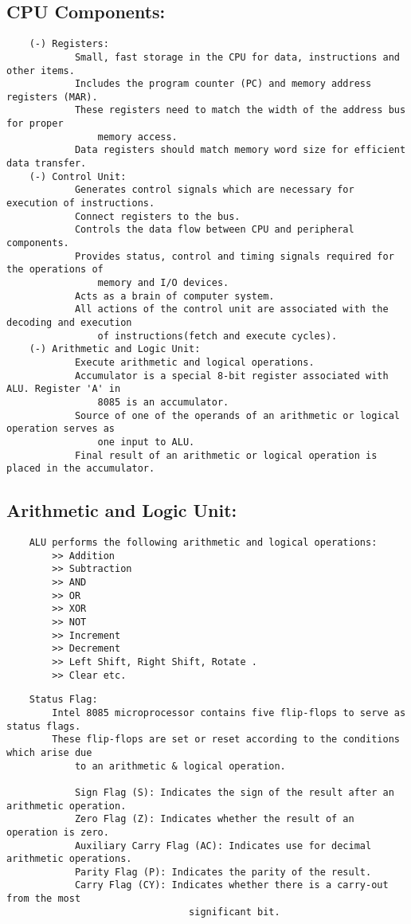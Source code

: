 \documentclass{article}
\begin{document}
\subsection*{CPU Components:}
\begin{verbatim}
    (-) Registers:
            Small, fast storage in the CPU for data, instructions and other items.
            Includes the program counter (PC) and memory address registers (MAR).
            These registers need to match the width of the address bus for proper 
                memory access.
            Data registers should match memory word size for efficient data transfer.
    (-) Control Unit:
            Generates control signals which are necessary for execution of instructions.
            Connect registers to the bus.
            Controls the data flow between CPU and peripheral components.
            Provides status, control and timing signals required for the operations of
                memory and I/O devices.
            Acts as a brain of computer system.
            All actions of the control unit are associated with the decoding and execution
                of instructions(fetch and execute cycles).
    (-) Arithmetic and Logic Unit:
            Execute arithmetic and logical operations.
            Accumulator is a special 8-bit register associated with ALU. Register 'A' in
                8085 is an accumulator.
            Source of one of the operands of an arithmetic or logical operation serves as
                one input to ALU.
            Final result of an arithmetic or logical operation is placed in the accumulator.
\end{verbatim}

\subsection*{Arithmetic and Logic Unit:}
\begin{verbatim}
    ALU performs the following arithmetic and logical operations:
        >> Addition
        >> Subtraction
        >> AND
        >> OR
        >> XOR
        >> NOT
        >> Increment
        >> Decrement
        >> Left Shift, Right Shift, Rotate .
        >> Clear etc.
\end{verbatim}
\newpage

\begin{verbatim}
    Status Flag:
        Intel 8085 microprocessor contains five flip-flops to serve as status flags.
        These flip-flops are set or reset according to the conditions which arise due
            to an arithmetic & logical operation.

            Sign Flag (S): Indicates the sign of the result after an arithmetic operation.
            Zero Flag (Z): Indicates whether the result of an operation is zero.
            Auxiliary Carry Flag (AC): Indicates use for decimal arithmetic operations.
            Parity Flag (P): Indicates the parity of the result.
            Carry Flag (CY): Indicates whether there is a carry-out from the most 
                                significant bit.
\end{verbatim}
\end{document}
